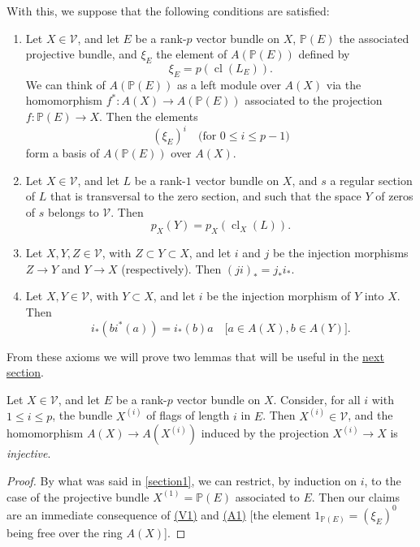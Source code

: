 \documentclass{article}
\theoremstyle{plain}
\newenvironment{lemma}[1]
    {\renewcommand\theinnercustomlemma{#1}\innercustomlemma}
    {\endinnercustomlemma}
\theoremstyle{definition}
\newcommand{\cat}{\mathcal}
\renewcommand{\leq}{\leqslant}
\DeclareMathOperator{\cl}{cl}
\newcommand{\oldpage}[1]{\marginpar{\footnotesize$\Big\vert$ \textit{p.~#1}}}
\begin{document}
With this, we suppose that the following conditions are satisfied:
\begin{enumerate}[({A}1)]
  \item\label{axiomA1}
    Let $X\in\cat{V}$, and let $E$ be a rank-$p$ vector bundle on $X$, $\mathbb{P}(E)$ the associated projective bundle, and $\xi_E$ the element of $A(\mathbb{P}(E))$ defined by
    \[
      \xi_E = p(\cl(L_E)).
    \]
    We can think of $A(\mathbb{P}(E))$ as a left module over $A(X)$ via the homomorphism $f^*\colon A(X)\to A(\mathbb{P}(E))$ associated to the projection $f\colon\mathbb{P}(E)\to X$.
    Then the elements
    \[
      (\xi_E)^i
      \quad\mbox{(for $0\leq i\leq p-1$)}
    \]
    form a basis of $A(\mathbb{P}(E))$ over $A(X)$.
  \item\label{axiomA2}
    Let $X\in\cat{V}$, and let $L$ be a rank-$1$ vector bundle on $X$, and $s$ a regular section of $L$ that is transversal to the zero section, and such that the space $Y$ of zeros of $s$ belongs to $\cat{V}$.
    Then
    \[
      p_X(Y) = p_X(\cl_X(L)).
    \]
  \item\label{axiomA3}
    Let $X,Y,Z\in\cat{V}$, with $Z\subset Y\subset X$, and let $i$ and $j$ be the injection morphisms $Z\to Y$ and $Y\to X$ (respectively).
    Then $(ji)_* = j_*i_*$.
  \item\label{axiomA4}
    Let $X,Y\in\cat{V}$, with $Y\subset X$, and let $i$ be the injection morphism of $Y$
\oldpage{141}
  into $X$.
    Then
    \[
      i_*(bi^*(a)) = i_*(b)a
      \quad\mbox{[$a\in A(X),b\in A(Y)$].}
    \]
\end{enumerate}

From these axioms we will prove two lemmas that will be useful in the \hyperref[section3]{next section}.

\begin{lemma}{1}
\label{lemma1}
  Let $X\in\cat{V}$, and let $E$ be a rank-$p$ vector bundle on $X$.
  Consider, for all $i$ with $1\leq i\leq p$, the bundle $X^{(i)}$ of flags of length $i$ in $E$.
  Then $X^{(i)}\in\cat{V}$, and the homomorphism $A(X)\to A(X^{(i)})$ induced by the projection $X^{(i)}\to X$ is \emph{injective}.
\end{lemma}

\begin{proof}
  By what was said in \cref{section1}, we can restrict, by induction on $i$, to the case of the projective bundle $X^{(1)}=\mathbb{P}(E)$ associated to $E$.
  Then our claims are an immediate consequence of \hyperref[axiomV1]{(V1)} and \hyperref[axiomA1]{(A1)} [the element $1_{\mathbb{P}(E)}=(\xi_E)^0$ being free over the ring $A(X)$].
\end{proof}
\end{document}
